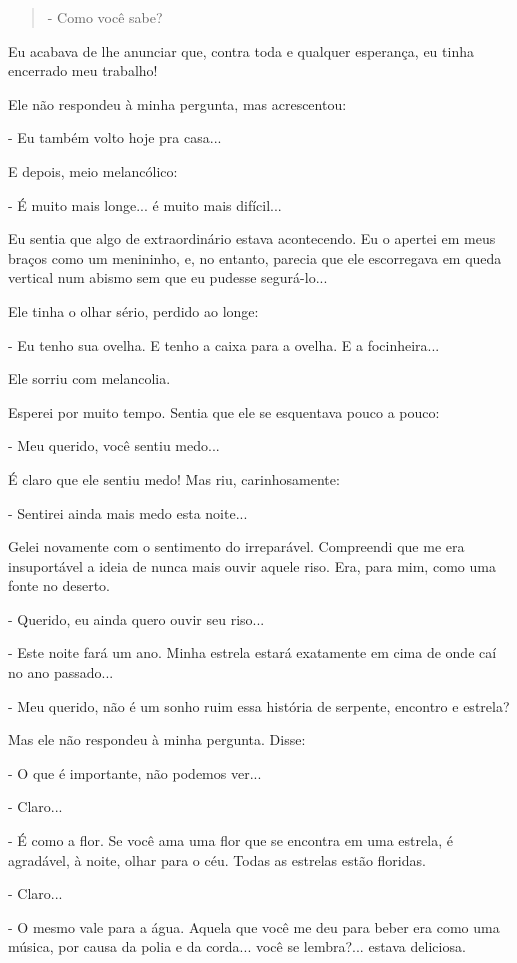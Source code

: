 \begin{quote}
- Como você sabe?
\end{quote}

Eu acabava de lhe anunciar que, contra toda e qualquer esperança, eu
tinha encerrado meu trabalho!

Ele não respondeu à minha pergunta, mas acrescentou:

- Eu também volto hoje pra casa...

E depois, meio melancólico:

- É muito mais longe... é muito mais difícil...

Eu sentia que algo de extraordinário estava acontecendo. Eu o apertei em
meus braços como um menininho, e, no entanto, parecia que ele
escorregava em queda vertical num abismo sem que eu pudesse segurá-lo...

Ele tinha o olhar sério, perdido ao longe:

- Eu tenho sua ovelha. E tenho a caixa para a ovelha. E a focinheira...

Ele sorriu com melancolia.

Esperei por muito tempo. Sentia que ele se esquentava pouco a pouco:

- Meu querido, você sentiu medo...

É claro que ele sentiu medo! Mas riu, carinhosamente:

- Sentirei ainda mais medo esta noite...

Gelei novamente com o sentimento do irreparável. Compreendi que me era
insuportável a ideia de nunca mais ouvir aquele riso. Era, para mim,
como uma fonte no deserto.

- Querido, eu ainda quero ouvir seu riso...

- Este noite fará um ano. Minha estrela estará exatamente em cima de
onde caí no ano passado...

- Meu querido, não é um sonho ruim essa história de serpente, encontro e
estrela?

Mas ele não respondeu à minha pergunta. Disse:

- O que é importante, não podemos ver...

- Claro...

- É como a flor. Se você ama uma flor que se encontra em uma estrela, é
agradável, à noite, olhar para o céu. Todas as estrelas estão floridas.

- Claro...

- O mesmo vale para a água. Aquela que você me deu para beber era como
uma música, por causa da polia e da corda... você se lembra?... estava
deliciosa.

